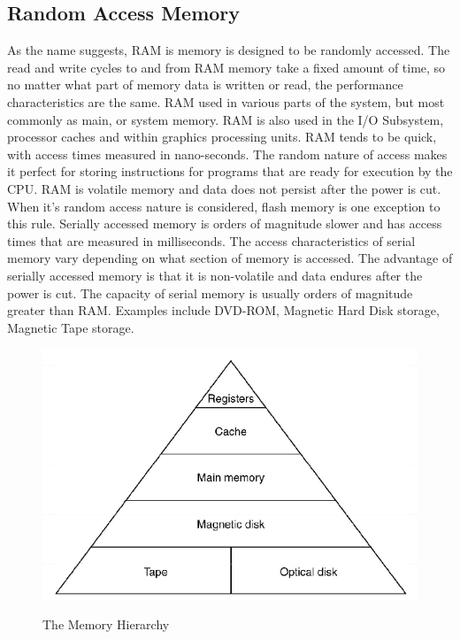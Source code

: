 \documentclass[10pt,a4paper]{article}
\begin{document}
\subsection{Random Access Memory}
As the name suggests, RAM is memory is designed to be randomly accessed. The read and write cycles to and from RAM memory take a fixed amount of time, so no matter what part of memory data is written or read, the performance characteristics are the same. RAM used in various parts of the system, but most commonly as main, or system memory. RAM is also used in the I/O Subsystem, processor caches and within graphics processing units. RAM tends to be quick, with access times measured in nano-seconds. The random nature of access makes it perfect for storing instructions for programs that are ready for execution by the CPU. RAM is volatile memory and data does not persist after the power is cut. When it's random access nature is considered, flash memory is one exception to this rule. \newline\newline Serially accessed memory is orders of magnitude slower and has access times that are measured in milliseconds. The access characteristics of serial memory vary depending on what section of memory is accessed. The advantage of serially accessed memory is that it is non-volatile and data endures after the power is cut. The capacity of serial memory is usually orders of magnitude greater than RAM. Examples include DVD-ROM, Magnetic Hard Disk storage, Magnetic Tape storage. 
\begin{figure}
\caption{The Memory Hierarchy\cite{OSCONCEPTS}}
\begin{center}
\includegraphics[scale=0.45]{../images/memory-h.png}
\label{memory-h}
\end{center}
\end{figure}
\end{document}
